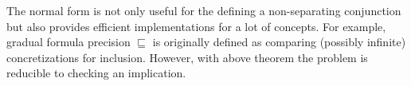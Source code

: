 The normal form is not only useful for the defining a non-separating conjunction but also provides efficient implementations for a lot of concepts.
For example, gradual formula precision $\sqsubseteq$ is originally defined as comparing (possibly infinite) concretizations for inclusion. However, with above theorem the problem is reducible to checking an implication.